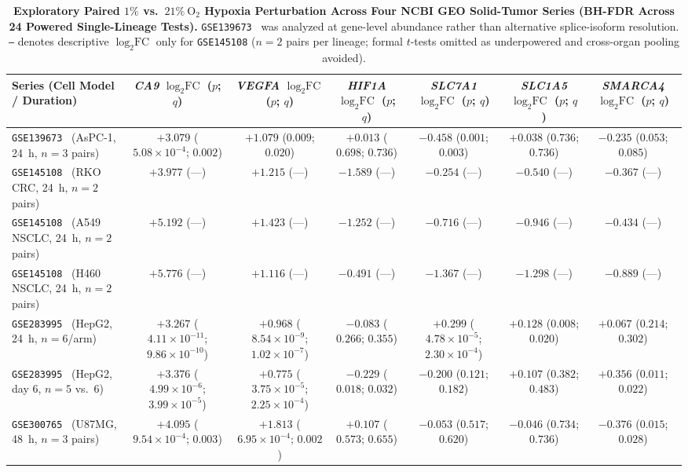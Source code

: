 \documentclass[11pt]{article}
\begin{document}
\begin{table}[htbp]
\centering
\caption{\textbf{Exploratory Paired $1\%$ vs.\ $21\%\ \text{O}_2$ Hypoxia Perturbation Across Four NCBI GEO Solid-Tumor Series (BH-FDR Across 24 Powered Single-Lineage Tests).} \texttt{GSE139673}~\cite{gse139673} was analyzed at gene-level abundance rather than alternative splice-isoform resolution. \texttt{---} denotes descriptive $\log_2\text{FC}$ only for \texttt{GSE145108} ($n = 2$ pairs per lineage; formal $t$-tests omitted as underpowered and cross-organ pooling avoided).}
\label{tab:geo}
\scriptsize
\setlength{\tabcolsep}{3.5pt}
\begin{adjustbox}{max width=\textwidth}
\begin{tabular}{@{}lcccccc@{}}
\toprule
\textbf{Series (Cell Model / Duration)} & \textbf{\textit{CA9} $\log_2\text{FC}$ ($p$; $q$)} & \textbf{\textit{VEGFA} $\log_2\text{FC}$ ($p$; $q$)} & \textbf{\textit{HIF1A} $\log_2\text{FC}$ ($p$; $q$)} & \textbf{\textit{SLC7A1} $\log_2\text{FC}$ ($p$; $q$)} & \textbf{\textit{SLC1A5} $\log_2\text{FC}$ ($p$; $q$)} & \textbf{\textit{SMARCA4} $\log_2\text{FC}$ ($p$; $q$)} \\
\midrule
\texttt{GSE139673}~\cite{gse139673} (AsPC-1, 24~h, $n=3$ pairs) & $+3.079$ ($5.08 \times 10^{-4}$; $0.002$) & $+1.079$ ($0.009$; $0.020$) & $+0.013$ ($0.698$; $0.736$) & $-0.458$ ($0.001$; $0.003$) & $+0.038$ ($0.736$; $0.736$) & $-0.235$ ($0.053$; $0.085$) \\
\texttt{GSE145108}~\cite{gse145108} (RKO CRC, 24~h, $n=2$ pairs) & $+3.977$ (---) & $+1.215$ (---) & $-1.589$ (---) & $-0.254$ (---) & $-0.540$ (---) & $-0.367$ (---) \\
\texttt{GSE145108}~\cite{gse145108} (A549 NSCLC, 24~h, $n=2$ pairs) & $+5.192$ (---) & $+1.423$ (---) & $-1.252$ (---) & $-0.716$ (---) & $-0.946$ (---) & $-0.434$ (---) \\
\texttt{GSE145108}~\cite{gse145108} (H460 NSCLC, 24~h, $n=2$ pairs) & $+5.776$ (---) & $+1.116$ (---) & $-0.491$ (---) & $-1.367$ (---) & $-1.298$ (---) & $-0.889$ (---) \\
\texttt{GSE283995}~\cite{gse283995} (HepG2, 24~h, $n=6$/arm) & $+3.267$ ($4.11 \times 10^{-11}$; $9.86 \times 10^{-10}$) & $+0.968$ ($8.54 \times 10^{-9}$; $1.02 \times 10^{-7}$) & $-0.083$ ($0.266$; $0.355$) & $+0.299$ ($4.78 \times 10^{-5}$; $2.30 \times 10^{-4}$) & $+0.128$ ($0.008$; $0.020$) & $+0.067$ ($0.214$; $0.302$) \\
\texttt{GSE283995}~\cite{gse283995} (HepG2, day 6, $n=5$ vs.\ 6) & $+3.376$ ($4.99 \times 10^{-6}$; $3.99 \times 10^{-5}$) & $+0.775$ ($3.75 \times 10^{-5}$; $2.25 \times 10^{-4}$) & $-0.229$ ($0.018$; $0.032$) & $-0.200$ ($0.121$; $0.182$) & $+0.107$ ($0.382$; $0.483$) & $+0.356$ ($0.011$; $0.022$) \\
\texttt{GSE300765}~\cite{gse300765} (U87MG, 48~h, $n=3$ pairs) & $+4.095$ ($9.54 \times 10^{-4}$; $0.003$) & $+1.813$ ($6.95 \times 10^{-4}$; $0.002$) & $+0.107$ ($0.573$; $0.655$) & $-0.053$ ($0.517$; $0.620$) & $-0.046$ ($0.734$; $0.736$) & $-0.376$ ($0.015$; $0.028$) \\
\bottomrule
\end{tabular}
\end{adjustbox}
\end{table}
\end{document}

